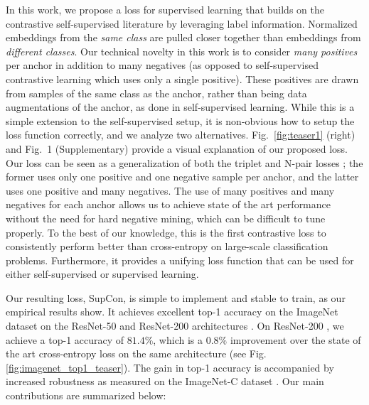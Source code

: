 In this work, we propose a loss for supervised learning that builds on the contrastive self-supervised literature by leveraging label information.
Normalized embeddings from the \emph{same class} are pulled closer together than embeddings from \emph{different classes}. Our technical novelty in this work is to consider \emph{many positives} per anchor in addition to many negatives (as opposed to self-supervised contrastive learning which uses only a single positive). These positives are drawn from samples of the same class as the anchor, rather than being data augmentations of the anchor, as done in self-supervised learning. While this is a simple extension to the self-supervised setup, it is non-obvious how to setup the loss function correctly, and we analyze two alternatives. Fig.~\ref{fig:teaser1} (right) and Fig.~1 (Supplementary) provide a visual explanation of our proposed loss. Our loss can be seen as a generalization of both the triplet \cite{weinberger2009distance} and N-pair losses \cite{sohn2016improved}; the former uses only one positive and one negative sample per anchor, and the latter uses one positive and many negatives. The use of many positives and many negatives for each anchor allows us to achieve state of the art performance without the need for hard negative mining, which can be difficult to tune properly. To the best of our knowledge, this is the first contrastive loss to consistently perform better than cross-entropy on large-scale classification problems. Furthermore, it provides a unifying loss function that can be used for either self-supervised or supervised learning.


Our resulting loss, SupCon, is simple to implement and stable to train, as our empirical results show. It achieves excellent top-1 accuracy on the ImageNet dataset on the ResNet-50 and ResNet-200 architectures \cite{he2016deep}. On ResNet-200 \cite{cubuk2019autoaugment}, we achieve a top-1 accuracy of $81.4\%$, which is a $0.8\%$ improvement over the state of the art \cite{lim2019fast} cross-entropy loss on the same architecture (see Fig. \ref{fig:imagenet_top1_teaser}). The gain in top-1 accuracy is accompanied by increased robustness as measured on the ImageNet-C dataset \cite{hendrycks2019benchmarking}. Our main contributions are summarized below:

